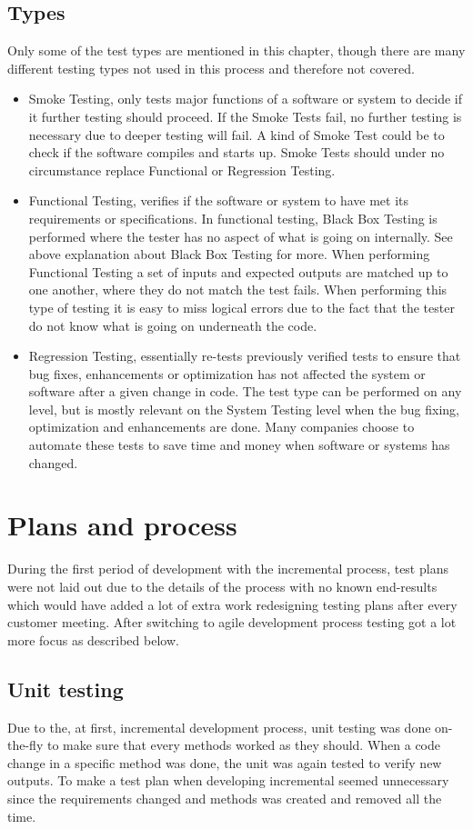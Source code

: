 \subsection{Types}
Only some of the test types are mentioned in this chapter, though there are many different testing types not used in this process and therefore not covered.
\begin{itemize}
\item Smoke Testing, only tests major functions of a software or system to decide if it further testing should proceed. If the Smoke Tests fail, no further testing is necessary due to deeper testing will fail. A kind of Smoke Test could be to check if the software compiles and starts up. Smoke Tests should under no circumstance replace Functional or Regression Testing.
\item Functional Testing, verifies if the software or system to have met its requirements or specifications. In functional testing, Black Box Testing is performed where the tester has no aspect of what is going on internally. See above explanation about Black Box Testing for more. When performing Functional Testing a set of inputs and expected outputs are matched up to one another, where they do not match the test fails. When performing this type of testing it is easy to miss logical errors due to the fact that the tester do not know what is going on underneath the code.
\item Regression Testing, essentially re-tests previously verified tests to ensure that bug fixes, enhancements or optimization has not affected the system or software after a given change in code. The test type can be performed on any level, but is mostly relevant on the System Testing level when the bug fixing, optimization and enhancements are done. Many companies choose to automate these tests to save time and money when software or systems has changed.
\end{itemize}
\section{Plans and process}
During the first period of development with the incremental process, test plans were not laid out due to the details of the process with no known end-results which would have added a lot of extra work redesigning testing plans after every customer meeting. After switching to agile development process testing got a lot more focus as described below.
\subsection{Unit testing}
Due to the, at first, incremental development process, unit testing was done on-the-fly to make sure that every methods worked as they should. When a code change in a specific method was done, the unit was again tested to verify new outputs. To make a test plan when developing incremental seemed unnecessary since the requirements changed and methods was created and removed all the time.

